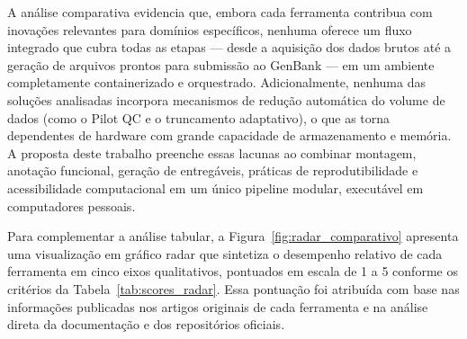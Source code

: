 A análise comparativa evidencia que, embora cada ferramenta contribua com inovações relevantes para domínios específicos, nenhuma oferece um fluxo integrado que cubra todas as etapas --- desde a aquisição dos dados brutos até a geração de arquivos prontos para submissão ao GenBank --- em um ambiente completamente containerizado e orquestrado. Adicionalmente, nenhuma das soluções analisadas incorpora mecanismos de redução automática do volume de dados (como o Pilot QC e o truncamento adaptativo), o que as torna dependentes de hardware com grande capacidade de armazenamento e memória. A proposta deste trabalho preenche essas lacunas ao combinar montagem, anotação funcional, geração de entregáveis, práticas de reprodutibilidade e acessibilidade computacional em um único pipeline modular, executável em computadores pessoais.


Para complementar a análise tabular, a Figura~\ref{fig:radar_comparativo} apresenta uma visualização em gráfico radar que sintetiza o desempenho relativo de cada ferramenta em cinco eixos qualitativos, pontuados em escala de 1 a 5 conforme os critérios da Tabela~\ref{tab:scores_radar}. Essa pontuação foi atribuída com base nas informações publicadas nos artigos originais de cada ferramenta e na análise direta da documentação e dos repositórios oficiais.

